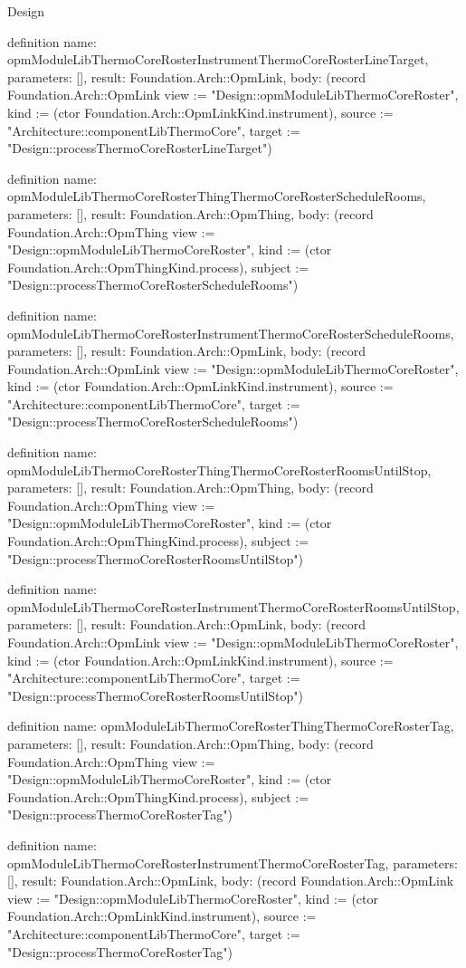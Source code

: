 \begin{lexlean}{Design}
\begin{semanticmodule}
definition{
  name: opmModuleLibThermoCoreRosterInstrumentThermoCoreRosterLineTarget,
  parameters: [],
  result: Foundation.Arch::OpmLink,
  body: (record Foundation.Arch::OpmLink {view := "Design::opmModuleLibThermoCoreRoster", kind := (ctor Foundation.Arch::OpmLinkKind.instrument), source := "Architecture::componentLibThermoCore", target := "Design::processThermoCoreRosterLineTarget"})
}

definition{
  name: opmModuleLibThermoCoreRosterThingThermoCoreRosterScheduleRooms,
  parameters: [],
  result: Foundation.Arch::OpmThing,
  body: (record Foundation.Arch::OpmThing {view := "Design::opmModuleLibThermoCoreRoster", kind := (ctor Foundation.Arch::OpmThingKind.process), subject := "Design::processThermoCoreRosterScheduleRooms"})
}

definition{
  name: opmModuleLibThermoCoreRosterInstrumentThermoCoreRosterScheduleRooms,
  parameters: [],
  result: Foundation.Arch::OpmLink,
  body: (record Foundation.Arch::OpmLink {view := "Design::opmModuleLibThermoCoreRoster", kind := (ctor Foundation.Arch::OpmLinkKind.instrument), source := "Architecture::componentLibThermoCore", target := "Design::processThermoCoreRosterScheduleRooms"})
}

definition{
  name: opmModuleLibThermoCoreRosterThingThermoCoreRosterRoomsUntilStop,
  parameters: [],
  result: Foundation.Arch::OpmThing,
  body: (record Foundation.Arch::OpmThing {view := "Design::opmModuleLibThermoCoreRoster", kind := (ctor Foundation.Arch::OpmThingKind.process), subject := "Design::processThermoCoreRosterRoomsUntilStop"})
}

definition{
  name: opmModuleLibThermoCoreRosterInstrumentThermoCoreRosterRoomsUntilStop,
  parameters: [],
  result: Foundation.Arch::OpmLink,
  body: (record Foundation.Arch::OpmLink {view := "Design::opmModuleLibThermoCoreRoster", kind := (ctor Foundation.Arch::OpmLinkKind.instrument), source := "Architecture::componentLibThermoCore", target := "Design::processThermoCoreRosterRoomsUntilStop"})
}

definition{
  name: opmModuleLibThermoCoreRosterThingThermoCoreRosterTag,
  parameters: [],
  result: Foundation.Arch::OpmThing,
  body: (record Foundation.Arch::OpmThing {view := "Design::opmModuleLibThermoCoreRoster", kind := (ctor Foundation.Arch::OpmThingKind.process), subject := "Design::processThermoCoreRosterTag"})
}

definition{
  name: opmModuleLibThermoCoreRosterInstrumentThermoCoreRosterTag,
  parameters: [],
  result: Foundation.Arch::OpmLink,
  body: (record Foundation.Arch::OpmLink {view := "Design::opmModuleLibThermoCoreRoster", kind := (ctor Foundation.Arch::OpmLinkKind.instrument), source := "Architecture::componentLibThermoCore", target := "Design::processThermoCoreRosterTag"})
}


\end{semanticmodule}
\end{lexlean}

